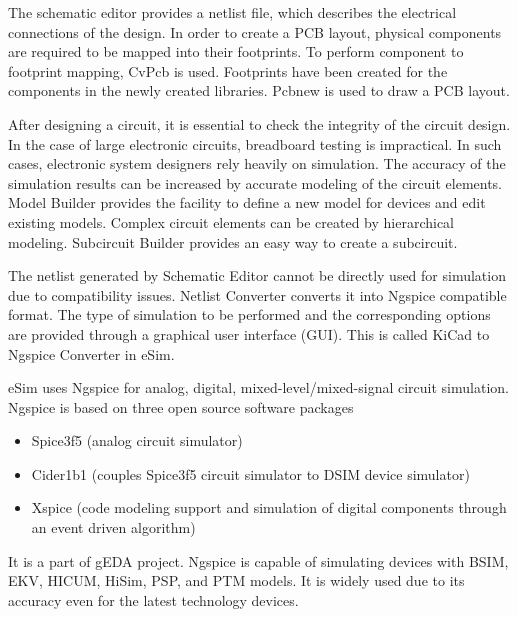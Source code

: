 The schematic editor provides a netlist file, which describes the
electrical connections of the  design. In order to create a PCB
layout, physical components are required to be mapped into their
footprints. To perform component to footprint mapping, CvPcb  is
used. Footprints have been created for the
components in the newly created libraries. Pcbnew is used to draw a
PCB layout. 

After designing a circuit, it is essential to check the integrity of
the circuit design. In the case of large electronic circuits,
breadboard testing is impractical. In such cases, electronic system
designers rely heavily on simulation. 
The accuracy of the simulation results can be increased by accurate
modeling of the circuit elements.
Model Builder provides the facility
to define a new model for devices and edit existing models. Complex
circuit elements can be created by hierarchical modeling. Subcircuit
Builder provides an easy way to create a subcircuit. 

The netlist generated by Schematic Editor cannot be directly used
for simulation due to compatibility issues. Netlist Converter converts
it into Ngspice compatible format. The type of simulation
to be performed and the corresponding options are
provided through a graphical user interface (GUI). This is called
KiCad to Ngspice Converter in eSim. 

eSim uses Ngspice for analog, digital, mixed-level/mixed-signal circuit
simulation. Ngspice is based on three open source software
packages%
\begin{itemize}
\item Spice3f5 (analog circuit simulator) 
\item Cider1b1 (couples Spice3f5 circuit simulator to DSIM device simulator)
\item Xspice (code modeling support and simulation of digital components through an event driven algorithm)
\end{itemize}
It is a part of gEDA  project. Ngspice is capable of
simulating devices with BSIM,  EKV,  HICUM, 
 HiSim,  PSP,  and PTM 
models. It is widely used due to its accuracy even for the latest
technology devices.
